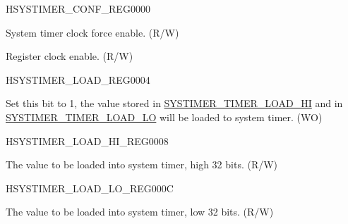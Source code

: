 \begin{register}{H}{SYSTIMER\_CONF\_REG}{\hexprefix{}0000}\label{regdesc:SYSTIMERCONFREG}
%
%
%
\regnewline%
\begin{regdesc}\begin{reglist}
\label{fielddesc:SYSTIMERCLKFO}\item [SYSTIMER\_CLK\_FO] System timer clock force enable. (R/W)
\label{fielddesc:SYSTIMERCLKEN}\item [SYSTIMER\_CLK\_EN] Register clock enable. (R/W)
\end{reglist}\end{regdesc}
\end{register}


\begin{register}{H}{SYSTIMER\_LOAD\_REG}{\hexprefix{}0004}\label{regdesc:SYSTIMERLOADREG}
%
%
\regnewline%
\begin{regdesc}\begin{reglist}
\label{fielddesc:SYSTIMERTIMERLOAD}\item [SYSTIMER\_TIMER\_LOAD] Set this bit to 1, the value stored in \hyperref[fielddesc:SYSTIMERTIMERLOADHI]{SYSTIMER\_TIMER\_LOAD\_HI} and in \hyperref[fielddesc:SYSTIMERTIMERLOADLO]{SYSTIMER\_TIMER\_LOAD\_LO} will be loaded to system timer. (WO)
\end{reglist}\end{regdesc}
\end{register}


\begin{register}{H}{SYSTIMER\_LOAD\_HI\_REG}{\hexprefix{}0008}\label{regdesc:SYSTIMERLOADHIREG}
%
\regnewline%
\begin{regdesc}\begin{reglist}
\label{fielddesc:SYSTIMERTIMERLOADHI}\item [SYSTIMER\_TIMER\_LOAD\_HI] The value to be loaded into system timer, high 32 bits. (R/W)
\end{reglist}\end{regdesc}
\end{register}


\begin{register}{H}{SYSTIMER\_LOAD\_LO\_REG}{\hexprefix{}000C}\label{regdesc:SYSTIMERLOADLOREG}
%
\regnewline%
\begin{regdesc}\begin{reglist}
\label{fielddesc:SYSTIMERTIMERLOADLO}\item [SYSTIMER\_TIMER\_LOAD\_LO] The value to be loaded into system timer, low 32 bits. (R/W)
\end{reglist}\end{regdesc}
\end{register}


